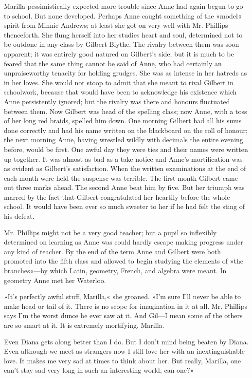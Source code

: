 Marilla pessimistically expected more trouble since Anne had again begun to go to school. But none developed. Perhaps Anne caught something of the »model« spirit from Minnie Andrews; at least she got on very well with Mr. Phillips thenceforth. She flung herself into her studies heart and soul, determined not to be outdone in any class by Gilbert Blythe. The rivalry between them was soon apparent; it was entirely good natured on Gilbert’s side; but it is much to be feared that the same thing cannot be said of Anne, who had certainly an unpraiseworthy tenacity for holding grudges. She was as intense in her hatreds as in her loves. She would not stoop to admit that she meant to rival Gilbert in schoolwork, because that would have been to acknowledge his existence which Anne persistently ignored; but the rivalry was there and honours fluctuated between them. Now Gilbert was head of the spelling class; now Anne, with a toss of her long red braids, spelled him down. One morning Gilbert had all his sums done correctly and had his name written on the blackboard on the roll of honour; the next morning Anne, having wrestled wildly with decimals the entire evening before, would be first. One awful day they were ties and their names were written up together. It was almost as bad as a take-notice and Anne’s mortification was as evident as Gilbert’s satisfaction. When the written examinations at the end of each month were held the suspense was terrible. The first month Gilbert came out three marks ahead. The second Anne beat him by five. But her triumph was marred by the fact that Gilbert congratulated her heartily before the whole school. It would have been ever so much sweeter to her if he had felt the sting of his defeat.

Mr. Phillips might not be a very good teacher; but a pupil so inflexibly determined on learning as Anne was could hardly escape making progress under any kind of teacher. By the end of the term Anne and Gilbert were both promoted into the fifth class and allowed to begin studying the elements of »the branches«—by which Latin, geometry, French, and algebra were meant. In geometry Anne met her Waterloo.

»It’s perfectly awful stuff, Marilla,« she groaned. »I’m sure I’ll never be able to make head or tail of it. There is no scope for imagination in it at all. Mr. Phillips says I’m the worst dunce he ever saw at it. And Gil—I mean some of the others are so smart at it. It is extremely mortifying, Marilla.

Even Diana gets along better than I do. But I don’t mind being beaten by Diana. Even although we meet as strangers now I still love her with an inextinguishable love. It makes me very sad at times to think about her. But really, Marilla, one can’t stay sad very long in such an interesting world, can one?«